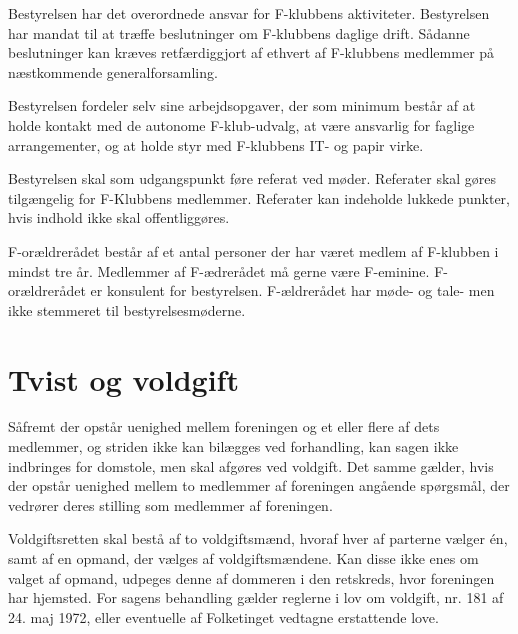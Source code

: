\documentclass[a4paper,12pt,danish]{article}
\begin{document}
\begin{list}
\item Bestyrelsen har det overordnede ansvar for F-klubbens
  aktiviteter. Bestyrelsen har mandat til at træffe beslutninger om
  F-klubbens daglige drift. Sådanne beslutninger kan kræves
  retfærdiggjort af ethvert af F-klubbens medlemmer på næstkommende
  generalforsamling.

  
\item Bestyrelsen fordeler selv sine arbejdsopgaver, der som minimum
  består af at holde kontakt med de autonome F-klub-udvalg, at
  være ansvarlig for faglige arrangementer, og at holde styr med
  F-klubbens IT- og papir virke.

\item Bestyrelsen skal som udgangspunkt føre referat ved møder.
  Referater skal gøres tilgængelig for F-Klubbens medlemmer.
  Referater kan indeholde lukkede punkter, hvis indhold ikke skal offentliggøres.

\item F-orældrerådet består af et antal
  personer der har været medlem af F-klubben i mindst tre år.
  Medlemmer af F-ædrerådet må gerne være F-eminine.
  F-orældrerådet er konsulent for bestyrelsen. F-ældrerådet
  har møde- og tale- men ikke stemmeret til bestyrelsesmøderne.

\section{Tvist og voldgift}

\item Såfremt der opstår uenighed mellem foreningen og et
  eller flere af dets medlemmer, og striden ikke kan bilægges ved
  forhandling, kan sagen ikke indbringes for domstole, men skal
  afgøres ved voldgift. Det samme gælder, hvis der opstår
  uenighed mellem to medlemmer af foreningen angående
  spørgsmål, der vedrører deres stilling som medlemmer af
  foreningen. 
  
  Voldgiftsretten skal bestå af to voldgiftsmænd, hvoraf hver
  af parterne vælger \'{e}n, samt af en opmand, der vælges af
  voldgiftsmændene. Kan disse ikke enes om valget af opmand,
  udpeges denne af dommeren i den retskreds, hvor foreningen har
  hjemsted. For sagens behandling gælder reglerne i lov om
  voldgift, nr. 181 af 24. maj 1972, eller eventuelle af Folketinget
  vedtagne erstattende love.


\end{list}
\end{document}
